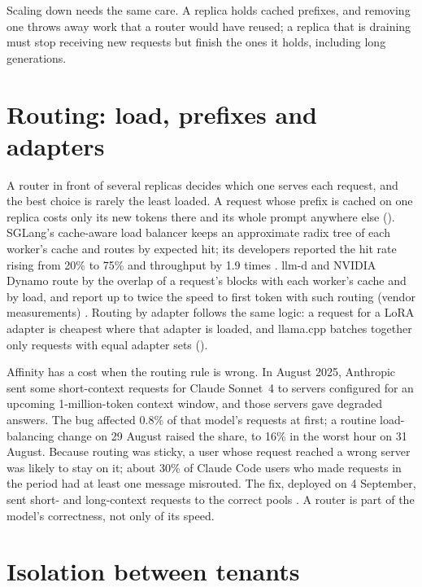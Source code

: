 Scaling down needs the same care. A replica holds cached prefixes, and removing
one throws away work that a router would have reused; a replica that is draining
must stop receiving new requests but finish the ones it holds, including long
generations.

\section{Routing: load, prefixes and adapters}

A router in front of several replicas decides which one serves each request,
and the best choice is rarely the least loaded. A request whose prefix is cached
on one replica costs only its new tokens there and its whole prompt anywhere
else (). SGLang's cache-aware load balancer keeps an
approximate radix tree of each worker's cache and routes by expected hit; its
developers reported the hit rate rising from 20\% to 75\% and throughput by 1.9
times \cite{sglang2024v04}. llm-d and NVIDIA Dynamo route by the overlap of a
request's blocks with each worker's cache and by load, and report up to twice
the speed to first token with such routing (vendor measurements)
\cite{llmd2026,nvidia2026dynamo}. Routing by adapter follows the same logic: a
request for a LoRA adapter is cheapest where that adapter is loaded, and
llama.cpp batches together only requests with equal adapter sets
().

Affinity has a cost when the routing rule is wrong. In August 2025, Anthropic
sent some short-context requests for Claude Sonnet~4 to servers configured for
an upcoming 1-million-token context window, and those servers gave degraded
answers. The bug affected 0.8\% of that model's requests at first; a routine
load-balancing change on 29 August raised the share, to 16\% in the worst hour on
31 August. Because routing was sticky, a user whose request reached a wrong
server was likely to stay on it; about 30\% of Claude Code users who made
requests in the period had at least one message misrouted. The fix, deployed on
4 September, sent short- and long-context requests to the correct pools
\cite{anthropic2025postmortem}. A router is part of the model's correctness, not
only of its speed.

\section{Isolation between tenants}

